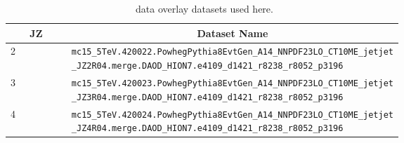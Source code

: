 \begin{table}[htbp]
\centering
\begin{tabular}{|l|p{0.65\linewidth}|}
\hline
\multicolumn{1}{|c|}{JZ} & \multicolumn{1}{c|}{Dataset Name}                 		                                  \tabularnewline \hline
2	& {\tt \footnotesize mc15\_5TeV.420022.PowhegPythia8EvtGen\_A14\_NNPDF23LO\_CT10ME\_jetjet \_JZ2R04.merge.DAOD\_HION7.e4109\_d1421\_r8238\_r8052\_p3196}                                                     \tabularnewline \hline
3	& {\tt \footnotesize mc15\_5TeV.420023.PowhegPythia8EvtGen\_A14\_NNPDF23LO\_CT10ME\_jetjet \_JZ3R04.merge.DAOD\_HION7.e4109\_d1421\_r8238\_r8052\_p3196}                                                                                  \tabularnewline \hline
4	& {\tt \footnotesize mc15\_5TeV.420024.PowhegPythia8EvtGen\_A14\_NNPDF23LO\_CT10ME\_jetjet \_JZ4R04.merge.DAOD\_HION7.e4109\_d1421\_r8238\_r8052\_p3196}                                                                   \tabularnewline \hline
\end{tabular}
\caption{\pbpb\ data overlay datasets used here.}
\label{tab:overlay}
\end{table}

\clearpage
